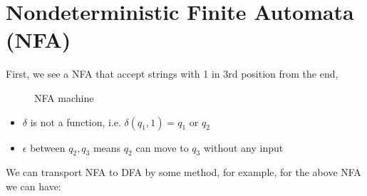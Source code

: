 
\section{Nondeterministic Finite Automata (NFA)}

First, we see a NFA that accept strings with 1 in 3rd position from the end,

\begin{figure}[H]
    \centering
    \caption{NFA machine}
\end{figure}

\begin{itemize}
    \item $\delta$ is not a function, i.e. $\delta(q_1, 1) = q_1 \text{ or } q_2$
    \item $\epsilon$ between $q_2, q_3$ means $q_2$ can move to $q_3$ without any input
\end{itemize}

\newpage

We can transport NFA to DFA by some method, for example, for the above NFA we can have:


